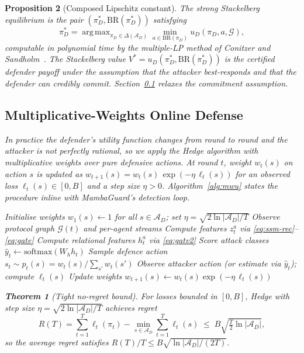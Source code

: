 \documentclass{ieeeaccess}
\newcommand{\calA}{\mathcal{A}}
\newcommand{\calG}{\mathcal{G}}
\DeclareMathOperator*{\argmax}{arg\,max}
\newtheorem{theorem}{Theorem}
\newtheorem{proposition}[theorem]{Proposition}
\begin{document}
\begin{proposition}[Composed Lipschitz constant]
The strong Stackelberg equilibrium is the pair $(\pi_{D}^{*},\mathrm{BR}(\pi_{D}^{*}))$ satisfying
\begin{equation}
\pi_{D}^{*} = \argmax_{\pi_{D}\in\Delta(\calA_{D})}\min_{a\in\mathrm{BR}(\pi_{D})}u_{D}(\pi_{D},a,\calG),
\label{eq:stack}
\end{equation}
computable in polynomial time by the multiple-LP method of Conitzer and Sandholm~\cite{Conitzer2006Commit,Paruchuri2008DOBSS}. The Stackelberg value $V^{*}=u_{D}(\pi_{D}^{*},\mathrm{BR}(\pi_{D}^{*}))$ is the certified defender payoff under the assumption that the attacker best-responds and that the defender can credibly commit. Section~\ref{sec:noregret} relaxes the commitment assumption.

\subsection{Multiplicative-Weights Online Defense}
\label{sec:noregret}
In practice the defender's utility function changes from round to round and the attacker is not perfectly rational, so we apply the Hedge algorithm with multiplicative weights over pure defensive actions. At round $t$, weight $w_{t}(s)$ on action $s$ is updated as $w_{t+1}(s)=w_{t}(s)\,\exp(-\eta\,\ell_{t}(s))$ for an observed loss $\ell_{t}(s)\in[0,B]$ and a step size $\eta>0$. Algorithm~\ref{alg:mwu} states the procedure inline with MambaGuard's detection loop.

\begin{algorithm}[!t]
\caption{MambaGuard online defence loop}
\label{alg:mwu}
\begin{algorithmic}[1]
\STATE Initialise weights $w_{1}(s)\!\leftarrow\!1$ for all $s\!\in\!\calA_{D}$; set $\eta=\sqrt{2\ln|\calA_{D}|/T}$
  \STATE Observe protocol graph $\calG(t)$ and per-agent streams
  \STATE Compute features $z^{a}_{t}$ via \eqref{eq:ssm-rec}--\eqref{eq:gate}
  \STATE Compute relational features $h^{a}_{t}$ via \eqref{eq:gatv2}
  \STATE Score attack classes $\hat y_{t}\!\leftarrow\!\mathrm{softmax}(W_{h} h_{t})$
  \STATE Sample defence action $s_{t}\!\sim\!p_{t}(s)\!=\!w_{t}(s)/\sum_{s'} w_{t}(s')$
  \STATE Observe attacker action (or estimate via $\hat y_{t}$); compute $\ell_{t}(s)$
  \STATE Update weights $w_{t+1}(s)\!\leftarrow\!w_{t}(s)\exp(-\eta\,\ell_{t}(s))$
\ENDFOR
\end{algorithmic}
\end{algorithm}

\begin{theorem}[Tight no-regret bound]
\label{thm:regret}
For losses bounded in $[0,B]$, Hedge with step size $\eta=\sqrt{2\ln|\calA_{D}|/T}$ achieves regret
\begin{equation}
R(T) = \sum_{t=1}^{T}\ell_{t}(\pi_{t})-\min_{s\in\calA_{D}}\sum_{t=1}^{T}\ell_{t}(s) \;\le\; B\sqrt{\tfrac{T}{2}\ln|\calA_{D}|},
\label{eq:regret}
\end{equation}
so the average regret satisfies $R(T)/T\le B\sqrt{\ln|\calA_{D}|/(2T)}$.
\end{theorem}


\end{proposition}
\end{document}
